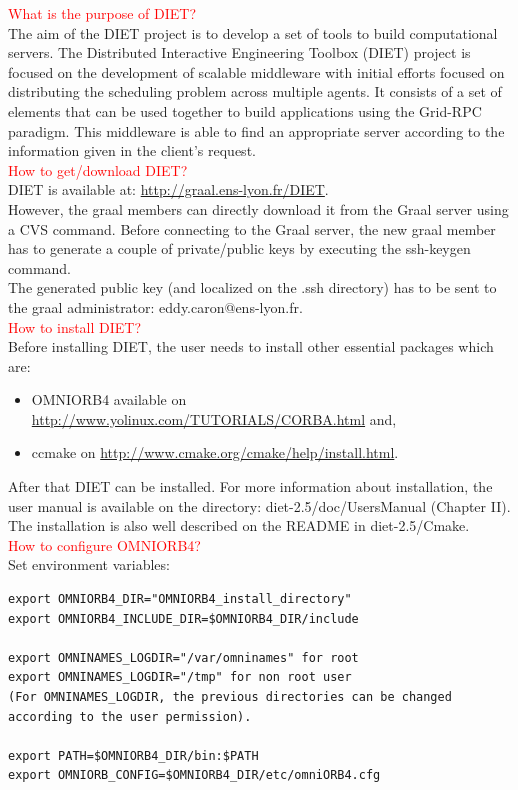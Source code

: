 \documentclass[12pt,a4paper]{book}
\newcommand{\dietversion}{2.5}
\begin{document}
\noindent \textcolor{red}{What is the purpose of DIET?}\\
The aim of the DIET project is to develop a set of tools to build computational servers. 
The Distributed Interactive Engineering Toolbox (DIET) project is focused on the development of scalable middleware with initial efforts focused on distributing the scheduling 
problem across multiple agents. It consists of a set of elements that can be used together to build applications using the Grid-RPC paradigm. 
This middleware is able to find an appropriate server according to the information given in the client's request.\\

\noindent \textcolor{red}{How to get/download DIET?}\\
DIET is available at: \url{http://graal.ens-lyon.fr/DIET}.\\
  
\noindent However, the graal members can directly download it from the Graal server using a CVS command. Before connecting to the Graal server, the new graal member has to generate a couple
of private/public keys by executing the ssh-keygen command.\\
The generated public key (and localized on the .ssh directory) has to be sent to the graal administrator: eddy.caron@ens-lyon.fr.\\
 
\noindent \textcolor{red}{How to install DIET?}\\
Before installing DIET, the user needs to install other essential packages which are: 

\begin{itemize}
 \item OMNIORB4 available on \url{http://www.yolinux.com/TUTORIALS/CORBA.html} and,
 \item ccmake on \url{http://www.cmake.org/cmake/help/install.html}.\\
\end{itemize}

\noindent After that DIET can be installed. For more information about installation, the user manual is available on the directory: diet-\dietversion/doc/UsersManual (Chapter II). The installation is also well described on the README in diet-\dietversion/Cmake.\\ 
  
\noindent \textcolor{red}{How to configure OMNIORB4?}\\
Set environment variables:
\begin{verbatim}
export OMNIORB4_DIR="OMNIORB4_install_directory"
export OMNIORB4_INCLUDE_DIR=$OMNIORB4_DIR/include

export OMNINAMES_LOGDIR="/var/omninames" for root 
export OMNINAMES_LOGDIR="/tmp" for non root user 
(For OMNINAMES_LOGDIR, the previous directories can be changed according to the user permission).
 
export PATH=$OMNIORB4_DIR/bin:$PATH
export OMNIORB_CONFIG=$OMNIORB4_DIR/etc/omniORB4.cfg 
\end{verbatim}
\end{document}
